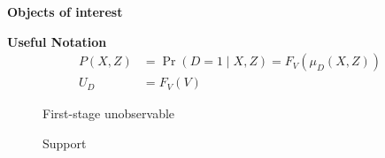 \begin{frame}\begin{center}
	\LARGE\textbf{Objects of interest}
\end{center}\end{frame}
\begin{frame}
	\textbf{Useful Notation}
	\begin{align*}
		P(X, Z) & = \Pr(D = 1\mid X, Z) = F_V(\mu_D(X, Z)) \\
		U_D     & = F_V(V)
	\end{align*}
\end{frame}

\begin{frame}
\begin{figure}[htp]\centering\caption{First-stage unobservable}
\end{figure}
\end{frame}
\begin{frame}
\begin{figure}[htp]\centering\caption{Support}
\end{figure}
\end{frame}

